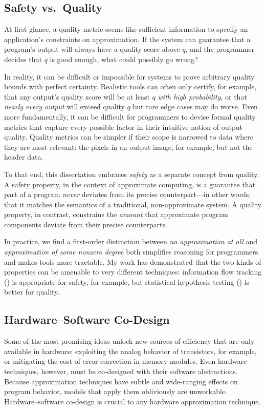 \subsection{Safety vs.~Quality}
\label{sec:princ:safety}

At first glance, a quality metric seems like sufficient information to specify
an application's constraints on approximation.
If the system can guarantee that a program's output will always have a quality
score above $q$, and the programmer decides that $q$ is good enough, what
could possibly go wrong?

In reality, it can be difficult or impossible for systems to prove arbitrary
quality bounds with perfect certainty.
Realistic tools can often only certify, for example, that any output's quality
score will be at least $q$ \emph{with high probability},
or that \emph{nearly every output} will exceed quality $q$ but rare edge cases
may do worse.
Even more fundamentally, it can be difficult for programmers to devise formal
quality metrics that capture every possible factor in their intuitive notion
of output quality.
Quality metrics can be simpler if their scope is narrowed to data where they
are most relevant: the pixels in an output image, for example, but not the
header data.

To that end, this dissertation embraces \emph{safety} as a separate concept
from quality.
A safety property, in the context of approximate computing, is a guarantee
that part of a program \emph{never} deviates from its precise counterpart---in
other words, that it matches the semantics of a traditional, non-approximate
system.
A quality property, in contrast, constrains the \emph{amount} that approximate
program components deviate from their precise counterparts.

In practice, we find a first-order distinction between \emph{no approximation at
all} and \emph{approximation of some nonzero degree} both simplifies reasoning
for programmers and makes tools more tractable.
My work has demonstrated that the two kinds of properties can be amenable to
very different techniques:
information flow tracking () is appropriate for safety, for
example, but statistical hypothesis testing () is better for
quality.

\subsection{Hardware--Software Co-Design}

Some of the most promising ideas unlock new sources of efficiency that are
only available in hardware:
exploiting the analog behavior of transistors, for example,
or mitigating the cost of error correction in memory modules.
Even hardware techniques, however, must be co-designed with their software
abstractions.
Because approximation techniques have subtle and wide-ranging effects on
program behavior,
models that apply them obliviously are unworkable.
Hardware--software co-design is crucial to any hardware approximation
technique.

